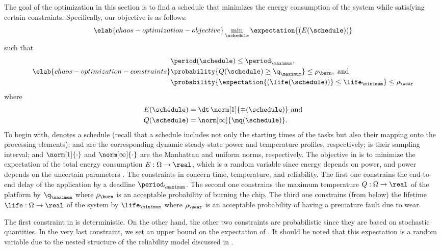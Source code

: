 The goal of the optimization in this section is to find a schedule that
minimizes the energy consumption of the system while satisfying certain
constraints. Specifically, our objective is as follows:
\begin{equation} \elab{chaos-optimization-objective}
  \min_{\schedule} \expectation{(E(\schedule))}
\end{equation}
such that
\begin{equation} \elab{chaos-optimization-constraints}
  \begin{split}
    & \period(\schedule) \leq \period_\maximum, \\
    & \probability{Q(\schedule) \geq \q_\maximum} \leq \rho_\burn, \text{ and} \\
    & \probability{\expectation{\left(\life(\schedule)\right)} \leq \life_\minimum} \leq \rho_\wear
  \end{split}
\end{equation}
where
\begin{align*}
  & E(\schedule) = \dt \, \norm[1]{\mp(\schedule)} \text{ and} \\
  & Q(\schedule) = \norm[\infty]{\mq(\schedule)}.
\end{align*}
To begin with, \schedule denotes a schedule (recall that a schedule includes not
only the starting times of the tasks but also their mapping onto the processing
elements); \mp and \mq are the corresponding dynamic steady-state power and
temperature profiles, respectively; \dt is their sampling interval; and
$\norm[1]{\cdot}$ and $\norm[\infty]{\cdot}$ are the Manhattan and uniform
norms, respectively. The objective in  is to
minimize the expectation of the total energy consumption $E: \Omega \to \real$,
which is a random variable since energy depends on power, and power depends on
the uncertain parameters \vu. The constraints in
 concern time, temperature, and
reliability. The first one constrains the end-to-end delay \period of the
application by a deadline $\period_\maximum$. The second one constrains the
maximum temperature $Q: \Omega \to \real$ of the platform by $\q_\maximum$ where
$\rho_\burn$ is an acceptable probability of burning the chip. The third one
constrains (from below) the lifetime $\life: \Omega \to \real$ of the system by
$\life_\minimum$ where $\rho_\wear$ is an acceptable probability of having a
premature fault due to wear.

The first constraint in  is deterministic.
On the other hand, the other two constraints are probabilistic since they are
based on stochastic quantities. In the very last constraint, we set an upper
bound on the expectation of \life. It should be noted that this expectation is a
random variable \perse due to the nested structure of the reliability model
discussed in .

